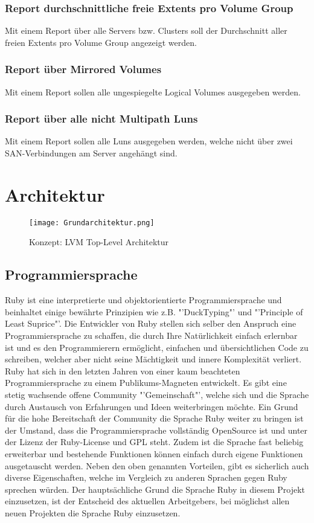 \subsubsection{Report durchschnittliche freie Extents pro Volume Group}
Mit einem Report über alle Servers bzw. Clusters soll der Durchschnitt aller freien Extents pro Volume Group angezeigt werden.

\subsubsection{Report über Mirrored Volumes}
Mit einem Report sollen alle ungespiegelte Logical Volumes ausgegeben werden.

\subsubsection{Report über alle nicht Multipath Luns}
Mit einem Report sollen alle Luns ausgegeben werden, welche nicht über zwei SAN-Verbindungen am Server angehängt sind.

\section{Architektur}
\begin{figure}
\centering
\texttt{[image: Grundarchitektur.png]}
\caption{Konzept: LVM Top-Level Architektur}
\label{fig:LVM Top-Level Architektur}
\end{figure}

\subsection{Programmiersprache}
Ruby ist eine interpretierte und objektorientierte Programmiersprache und beinhaltet einige bewährte Prinzipien wie z.B. "'DuckTyping"' und "'Principle of Least Suprice"'. Die Entwickler von Ruby stellen sich selber den Anspruch eine Programmiersprache zu schaffen, die durch Ihre Natürlichkeit einfach erlernbar ist und es den Programmierern ermöglicht, einfachen und übersichtlichen Code zu schreiben, welcher aber nicht seine Mächtigkeit und innere Komplexität verliert.
Ruby hat sich in den letzten Jahren von einer kaum beachteten Programmiersprache zu einem Publikums-Magneten entwickelt. Es gibt eine stetig wachsende offene Community "'Gemeinschaft"', welche sich und die Sprache durch Austausch von Erfahrungen und Ideen weiterbringen möchte.
Ein Grund für die hohe Bereitschaft der Community die Sprache Ruby weiter zu bringen ist der Umstand, dass die Programmiersprache vollständig OpenSource ist und unter der Lizenz der Ruby-License und GPL steht. Zudem ist die Sprache fast beliebig erweiterbar und bestehende Funktionen können einfach durch eigene Funktionen ausgetauscht werden.
Neben den oben genannten Vorteilen, gibt es sicherlich auch diverse Eigenschaften, welche im Vergleich zu anderen Sprachen gegen Ruby sprechen würden. Der hauptsächliche Grund die Sprache Ruby in diesem  Projekt einzusetzen, ist der Entscheid des aktuellen Arbeitgebers, bei möglichst allen neuen Projekten die Sprache Ruby einzusetzen.


